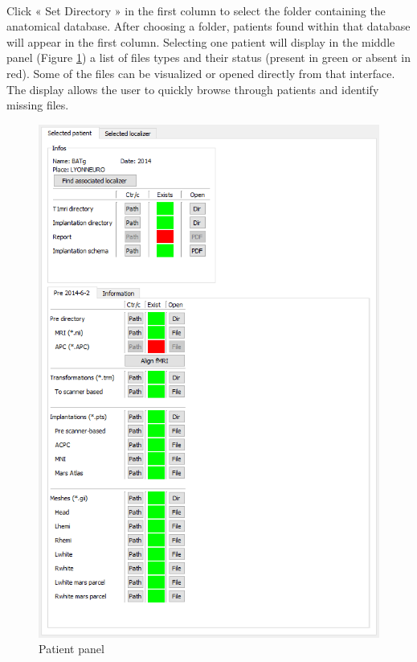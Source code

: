 \documentclass[a4paper]{article}
\begin{document}
\paragraph{} Click « Set Directory » in the first column to select the folder containing the anatomical database. After choosing a folder, patients found within that database will appear in the first column. Selecting one patient will display in the middle panel (Figure \ref{dbManagerPatient}) a list of files types and their status (present in green or absent in red). Some of the files can be visualized or opened directly from that interface. The display allows the user to quickly browse through patients and identify missing files.
\begin{figure}[H]
\begin{center}
\includegraphics[scale=0.5]{DBManagerPatient.png}
\end{center}
\caption{\label{dbManagerPatient}Patient panel}
\end{figure}
\end{document}
